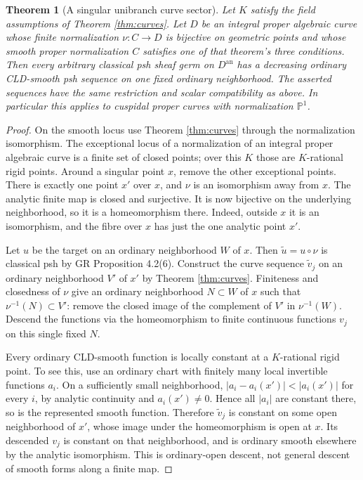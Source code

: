 \documentclass[11pt]{article}
\newtheorem{theorem}{Theorem}
\theoremstyle{remark}
\newcommand{\an}{\mathrm{an}}
\begin{document}
\begin{theorem}[A singular unibranch curve sector]\label{thm:unibranch}
Let $K$ satisfy the field assumptions of Theorem \ref{thm:curves}.
Let $D$ be an integral proper algebraic curve whose finite normalization
$\nu:C\to D$ is bijective on geometric points and whose smooth proper
normalization $C$ satisfies one of that theorem's three conditions.
Then every arbitrary classical psh sheaf germ on $D^\an$ has a decreasing
ordinary CLD-smooth psh sequence on one fixed ordinary neighborhood.
The asserted sequences have the same restriction and scalar compatibility
as above. In particular this applies to cuspidal proper curves with
normalization $\mathbb P^1$.
\end{theorem}
\begin{proof}
On the smooth locus use Theorem \ref{thm:curves} through the normalization
isomorphism. The exceptional locus of a normalization of an integral
proper algebraic curve is a finite set of closed points; over this $K$
those are $K$-rational rigid points. Around a singular point $x$, remove
the other exceptional points. There is exactly one point $x'$ over $x$,
and $\nu$ is an isomorphism away from $x$. The analytic finite map is
closed and surjective. It is now bijective on the underlying neighborhood,
so it is a homeomorphism there. Indeed, outside $x$ it is an isomorphism,
and the fibre over $x$ has just the one analytic point $x'$.

Let $u$ be the target on an ordinary neighborhood $W$ of $x$.
Then $\widetilde u=u\circ\nu$ is classical psh by GR Proposition 4.2(6).
Construct the curve sequence $\widetilde v_j$ on an ordinary neighborhood
$V'$ of $x'$ by Theorem \ref{thm:curves}. Finiteness and closedness of
$\nu$ give an ordinary neighborhood $N\subset W$ of $x$ such that
$\nu^{-1}(N)\subset V'$: remove the closed image of the complement of
$V'$ in $\nu^{-1}(W)$. Descend the functions via the homeomorphism to
finite continuous functions $v_j$ on this single fixed $N$.

Every ordinary CLD-smooth function is locally constant at a $K$-rational
rigid point. To see this, use an ordinary chart with finitely many local
invertible functions $a_i$. On a sufficiently small neighborhood,
$|a_i-a_i(x')|<|a_i(x')|$ for every $i$, by analytic continuity and
$a_i(x')\ne0$. Hence all $|a_i|$ are constant there, so is the represented
smooth function. Therefore $\widetilde v_j$ is constant on some open
neighborhood of $x'$, whose image under the homeomorphism is open at $x$.
Its descended $v_j$ is constant on that neighborhood, and is ordinary
smooth elsewhere by the analytic isomorphism. This is ordinary-open
descent, not general descent of smooth forms along a finite map.


\end{proof}
\end{document}
